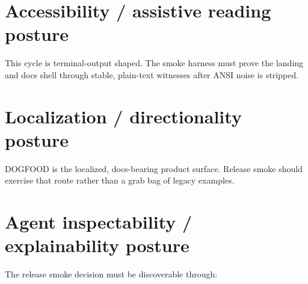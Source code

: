 \section{Accessibility / assistive reading posture}\label{record-201-accessibility-assistive-reading-posture}

This cycle is terminal-output shaped. The smoke harness must prove the landing and docs shell through stable, plain-text witnesses after ANSI noise is stripped.

\section{Localization / directionality posture}\label{record-201-localization-directionality-posture}

DOGFOOD is the localized, docs-bearing product surface. Release smoke should exercise that route rather than a grab bag of legacy examples.

\section{Agent inspectability / explainability posture}\label{record-201-agent-inspectability-explainability-posture}

The release smoke decision must be discoverable through:

